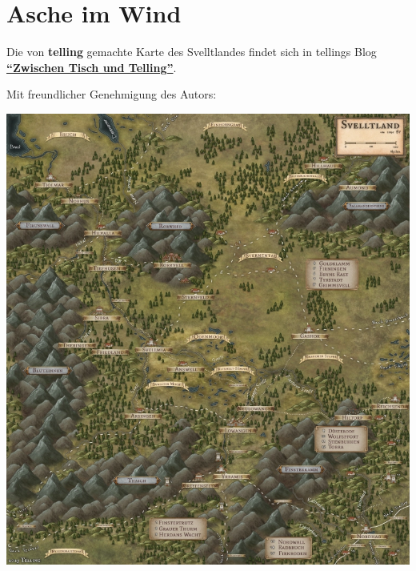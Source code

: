 \documentclass[openright]{Ilaris}
\begin{document}
\bigskip
\begin{center}
\end{center}







\section{Asche im Wind}

Die von \textbf{telling} gemachte Karte des Svelltlandes findet sich in tellings Blog \href{https://tellingaventurien.home.blog/2023/02/27/karte-svelltland-um-1045-nach-bosparans-fall/}{\textbf{\enquote{Zwischen Tisch und Telling}}}.

Mit freundlicher Genehmigung des Autors:

\begin{center}
	\includegraphics[width=\textwidth]{svellttal-0211.png}
\end{center}
\end{document}
